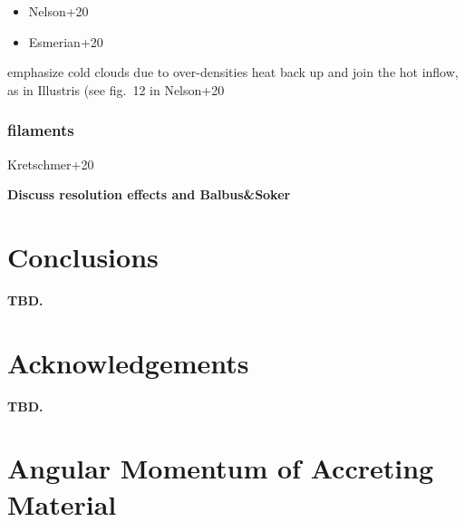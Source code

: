 \documentclass[fleqn,usenatbib]{mnras}
\begin{document}
\begin{itemize}
    \item Nelson+20
    \item Esmerian+20
\end{itemize}
emphasize cold clouds due to over-densities heat back up and join the hot inflow, as in Illustris (see fig.~12 in Nelson+20

\subsubsection{filaments}
Kretschmer+20

\textbf{Discuss resolution effects and Balbus\&Soker}

\section{Conclusions}

\textbf{TBD.}

\section*{Acknowledgements}

\textbf{TBD.}










\appendix

\section{Angular Momentum of Accreting Material}
\end{document}
